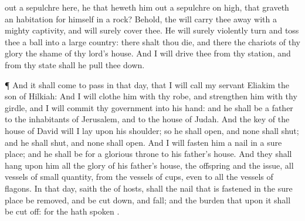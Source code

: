 {out a
sepulchre
here,
{} he that heweth him
out a
sepulchre on
high,
{} that
graveth an
habitation for himself in a
rock?
Behold, the
{} will carry thee
away with a
mighty
captivity, and will
surely
cover thee.
He will
surely violently
turn and
toss thee
{} a
ball into a
large
country: there shalt thou
die, and there the
chariots of thy
glory
{} the
shame of thy
lord’s
house.
And I will
drive thee from thy
station, and from thy
state shall he pull thee
down.
\par }{\PP {}¶ And it shall come to pass in that
day, that I will
call my
servant
Eliakim the
son of
Hilkiah:
And I will
clothe him with thy
robe, and
strengthen him with thy
girdle, and I will
commit thy
government into his
hand: and he shall be a
father to the
inhabitants of
Jerusalem, and to the
house of
Judah.
And the
key of the
house of
David will I
lay upon his
shoulder; so he shall
open, and none shall
shut; and he shall
shut, and none shall
open.
And I will
fasten him
{} a
nail in a
sure
place; and he shall be for a
glorious
throne to his
father’s
house.
And they shall
hang upon him all the
glory of his
father’s
house, the
offspring and the
issue, all
vessels of
small quantity, from the
vessels of
cups, even to all the
vessels of
flagons.
In that
day,
saith the
{} of
hosts, shall the
nail that is
fastened in the
sure
place be
removed, and be cut
down, and
fall; and the
burden that
{} upon it shall be cut
off: for the
{} hath
spoken
{}.

}
